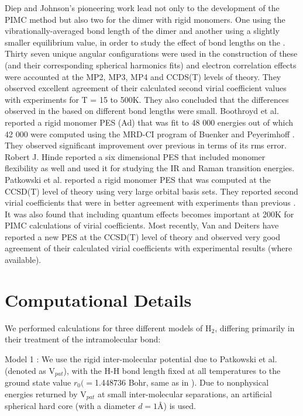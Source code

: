         Diep and Johnson's \cite{Diep2000} pioneering work lead not only to the development of the PIMC method but also two \abinitio{} \PESs{} for the dimer with rigid monomers. One using the vibrationally-averaged bond length of the dimer and another using a slightly smaller equilibrium value, in order to study the effect of bond lengths on the \PESs{}. Thirty seven unique angular configurations were used in the construction of these \PESs{} (and their corresponding spherical harmonics fits) and electron correlation effects were accounted at the MP2, MP3, MP4 and CCDS(T) levels of theory. They observed excellent agreement of their calculated second virial coefficient values with experiments for T = 15 to 500K. They also concluded that the differences observed in the \PESs{} based on different bond lengths were small. Boothroyd et al. \cite{Boothroyd2002} reported a rigid monomer PES (Ad) that was fit to \Sim{} 48 000 \abinitio{} energies out of which \Sim{} 42 000 were computed using the MRD-CI program of Buenker and Peyerimhoff \cite{Buenker1974}. They observed significant improvement over previous \PESs{} in terms of its rms error. Robert J. Hinde \cite{Hinde2008} reported a six dimensional PES that included monomer flexibility as well and used it for studying the IR and Raman transition energies. Patkowski et al. \cite{Patkowski2008} reported a rigid monomer PES that was computed at the CCSD(T) level of theory using very large orbital basis sets. They reported second virial coefficients that were in better agreement with experiments than previous \PESs{}. It was also found that including quantum effects becomes important at \Sim{} 200K for PIMC calculations of virial coefficients. Most recently, Van and Deiters \cite{Tat2015} have reported a new \abinitio{} PES at the CCSD(T) level of theory and observed very good agreement of their calculated virial coefficients with experimental results (where available).

    \section{Computational Details}
    \label{sec:Computational details}

        We performed calculations for three different models of H$_2$, differing primarily in their treatment of the intramolecular bond:

        Model 1 : We use the rigid inter-molecular potential due to Patkowski et al.\cite{Patkowski2008} (denoted as V$_{pat}$), with the H-H bond length fixed at all temperatures to the ground state value $r_0 ( = $1.448736 Bohr, same as in \cite{Patkowski2008}). Due to nonphysical energies returned by V$_{pat}$ at small inter-molecular separations, an artificial spherical hard core (with a diameter $d = 1${\AA}) is used.

